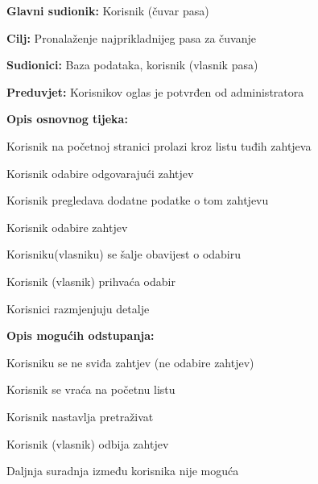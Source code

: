 					\noindent {}
					\begin{packed_item}
						
						\item \textbf{Glavni sudionik: } Korisnik (čuvar pasa)
						\item  \textbf{Cilj:} Pronalaženje najprikladnijeg pasa za čuvanje
						\item  \textbf{Sudionici:} Baza podataka, korisnik (vlasnik pasa)
						\item  \textbf{Preduvjet:} Korisnikov oglas je potvrđen od administratora
						\item  \textbf{Opis osnovnog tijeka:}
						
						\item[] \begin{packed_enum}
							
							\item Korisnik na početnoj stranici prolazi kroz listu tuđih zahtjeva   
							\item Korisnik odabire odgovarajući zahtjev
							\item Korisnik pregledava dodatne podatke o tom zahtjevu
							\item Korisnik odabire zahtjev 
							\item Korisniku(vlasniku) se šalje obavijest o odabiru
							\item Korisnik (vlasnik) prihvaća odabir
							\item Korisnici razmjenjuju detalje
							
						\end{packed_enum}
						
						\item  \textbf{Opis mogućih odstupanja:}
						
						\item[] \begin{packed_item}
							
							\item[4.a] Korisniku se ne sviđa zahtjev (ne odabire zahtjev)
							\item[] \begin{packed_enum}
								
								\item Korisnik se vraća na početnu listu
								\item Korisnik nastavlja pretraživat
								
							\end{packed_enum}
							
							\item[6.a] Korisnik (vlasnik) odbija zahtjev 
							\item[] \begin{packed_enum}
								
								\item Daljnja suradnja između korisnika nije moguća
								
							\end{packed_enum}
						\end{packed_item}
					\end{packed_item}	
					
